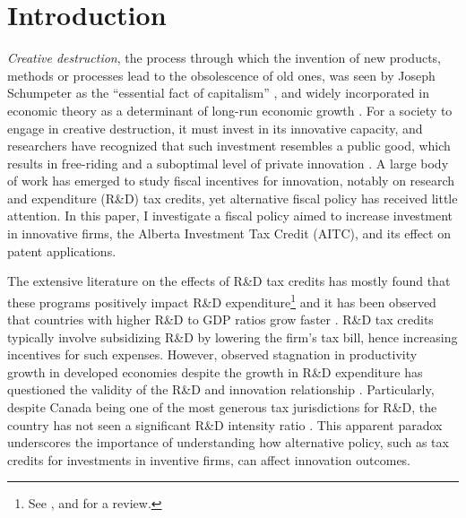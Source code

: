 \documentclass[../main.tex]{subfiles}
\begin{document}
\section{Introduction}
\label{sec:introduction}

\textit{Creative destruction}, the process through which the invention of new products, methods or processes lead to the obsolescence of old ones, was seen by Joseph Schumpeter as the \enquote{essential fact of capitalism} \parencite[p.24]{caballero10}, and widely incorporated in economic theory as a determinant of long-run economic growth \parencite{aghion_howitt92, artz_etal10, jones95}. For a society to engage in creative destruction, it must invest in its innovative capacity, and researchers have recognized that such investment resembles a public good, which results in free-riding and a suboptimal level of private innovation \parencite{bloom_etal19}. A large body of work has emerged to study fiscal incentives for innovation, notably on research and expenditure (R\&D) tax credits, yet alternative fiscal policy has received little attention. In this paper, I investigate a fiscal policy aimed to increase investment in innovative firms, the Alberta Investment Tax Credit (AITC), and its effect on patent applications. 

The extensive literature on the effects of R\&D tax credits has mostly found that these programs positively impact R\&D expenditure\footnote{See \textcite{becker15}, \textcite{hall_etal10} and \textcite{hall_vanreenen00} for a review.} and it has been observed that countries with higher R\&D to GDP ratios grow faster \parencite{jones16}. R\&D tax credits typically involve subsidizing R\&D by lowering the firm's tax bill, hence increasing incentives for such expenses. However, observed stagnation in productivity growth in developed economies despite the growth in R\&D expenditure has questioned the validity of the R\&D and innovation relationship \parencite{griliches88}. Particularly, despite Canada being one of the most generous tax jurisdictions for R\&D, the country has not seen a significant R\&D intensity ratio \parencite{mckenzie06}. This apparent paradox underscores the importance of understanding how alternative policy, such as tax credits for investments in inventive firms, can affect innovation outcomes.
\end{document}
